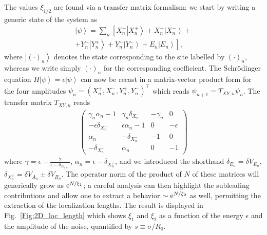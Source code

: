 \documentclass[prl,aps,twocolumn,showpacs,superscriptaddress,longbibliography]{revtex4-1}
\newcommand{\be}{\begin{equation}}
\newcommand{\ee}{\end{equation}}
\newcommand{\rme}[1]{{\rm{e}}^{#1}}
\newcommand{\lqq}{\left[}
\newcommand{\rqq}{\right]}
\newcommand{\ran}{\right\rangle}
\newcommand{\ket}[1]{\left| #1 \ran}
\begin{document}
The values $\xi_{1/2}$ are found via a transfer matrix formalism: we start by writing a generic state of the system as 
\be
\begin{split}
	\ket{\psi} = \sum_n \lqq  X_n^+ \ket{X_n^+} + X_n^- \ket{X_n^-} + \right. \\
	\left. + Y_n^+ \ket{Y_n^+} + Y_n^- \ket{Y_n^-} + E_n \ket{E_n}    \rqq,
\end{split}
\ee
where $\ket{(\cdot)_n}$ denotes the state corresponding to the site labelled by $(\cdot)_n$, whereas we write simply $(\cdot)_n$ for the corresponding coefficient. The Schr\"odinger equation $H \ket{\psi} = \epsilon \ket{\psi}$ can now be recast in a matrix-vector product form for the four amplitudes $\psi_n = (X_n^+, X_n^-, Y_n^+, Y_n^-)^\intercal$ \cite{SM} which reads $\psi_{n+1} = T_{XY,n} \psi_n$. The transfer matrix $T_{XY,n}$ reads
%
  \begin{align}
    \begin{pmatrix} 
	\gamma_n \alpha_n  -1        &   \gamma_n \delta_{X^-_n}                & -\gamma_n         & 0 \\
	  -\epsilon \delta_{X^-_n}          & \epsilon \alpha_n  -1              & 0      & -\epsilon \\
	  \alpha_n                                & -\delta_{X^-_n}                                          & -1              & 0\\
	    -\delta_{X^-_n}                                 &  \alpha_n                                        &  0              & -1        
  \end{pmatrix}
  \label{Eq:Transfer_Matrix}
  \end{align}
 where $\gamma = \epsilon - \tfrac{2}{\epsilon-\delta_{E_{n+1}}}$, $\alpha_n = \epsilon - \delta_{X^+_n}$, and we introduced the shorthand $\delta_{E_n} = \delta V_{E_n}$, $\delta_{X_n^\pm} = \delta V_{A_n} \pm \delta V_{B_n}$. The operator norm of the product of $N$ of these matrices will generically grow as $\rme{N / \xi_1}$; a careful analysis can then highlight the subleading contributions \cite{a_Dwivedi_PRB_93} and allow one to extract a behavior $\sim \rme{N / \xi_2}$ as well, permitting the extraction of the localization lengths. The result is displayed in Fig.~\ref{Fig:2D_loc_length} which shows $\xi_1$ and $\xi_2$ as a function of the energy $\epsilon$ and the amplitude of the noise, quantified by $s \equiv \sigma / R_0$. 





\end{document}
